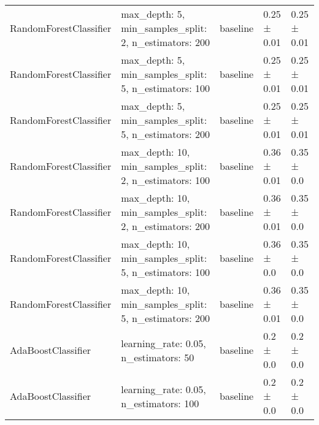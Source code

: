 \begin{tabular}{lllll}
    RandomForestClassifier     & max\_depth: 5, min\_samples\_split: 2, n\_estimators: 200                                                                            & baseline               & 0.25 ± 0.01             & 0.25 ± 0.01                  \\
    RandomForestClassifier     & max\_depth: 5, min\_samples\_split: 5, n\_estimators: 100                                                                            & baseline               & 0.25 ± 0.01             & 0.25 ± 0.01                  \\
    RandomForestClassifier     & max\_depth: 5, min\_samples\_split: 5, n\_estimators: 200                                                                            & baseline               & 0.25 ± 0.01             & 0.25 ± 0.01                  \\
    RandomForestClassifier     & max\_depth: 10, min\_samples\_split: 2, n\_estimators: 100                                                                           & baseline               & 0.36 ± 0.01             & 0.35 ± 0.0                   \\
    RandomForestClassifier     & max\_depth: 10, min\_samples\_split: 2, n\_estimators: 200                                                                           & baseline               & 0.36 ± 0.01             & 0.35 ± 0.0                   \\
    RandomForestClassifier     & max\_depth: 10, min\_samples\_split: 5, n\_estimators: 100                                                                           & baseline               & 0.36 ± 0.0              & 0.35 ± 0.0                   \\
    RandomForestClassifier     & max\_depth: 10, min\_samples\_split: 5, n\_estimators: 200                                                                           & baseline               & 0.36 ± 0.01             & 0.35 ± 0.0                   \\
    AdaBoostClassifier         & learning\_rate: 0.05, n\_estimators: 50                                                                                              & baseline               & 0.2 ± 0.0               & 0.2 ± 0.0                    \\
    AdaBoostClassifier         & learning\_rate: 0.05, n\_estimators: 100                                                                                             & baseline               & 0.2 ± 0.0               & 0.2 ± 0.0                    \\

\end{tabular}
